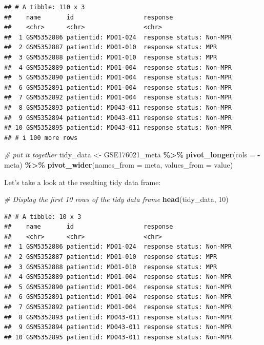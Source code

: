 \documentclass[
]{book}
\newenvironment{Shaded}{\begin{snugshade}}{\end{snugshade}}
\newcommand{\AttributeTok}[1]{\textcolor[rgb]{0.13,0.29,0.53}{#1}}
\newcommand{\CommentTok}[1]{\textcolor[rgb]{0.56,0.35,0.01}{\textit{#1}}}
\newcommand{\DecValTok}[1]{\textcolor[rgb]{0.00,0.00,0.81}{#1}}
\newcommand{\FunctionTok}[1]{\textcolor[rgb]{0.13,0.29,0.53}{\textbf{#1}}}
\newcommand{\NormalTok}[1]{#1}
\newcommand{\OtherTok}[1]{\textcolor[rgb]{0.56,0.35,0.01}{#1}}
\newcommand{\SpecialCharTok}[1]{\textcolor[rgb]{0.81,0.36,0.00}{\textbf{#1}}}
\begin{document}
\begin{verbatim}
## # A tibble: 110 x 3
##    name       id                   response                
##    <chr>      <chr>                <chr>                   
##  1 GSM5352886 patientid: MD01-024  response status: Non-MPR
##  2 GSM5352887 patientid: MD01-010  response status: MPR    
##  3 GSM5352888 patientid: MD01-010  response status: MPR    
##  4 GSM5352889 patientid: MD01-004  response status: Non-MPR
##  5 GSM5352890 patientid: MD01-004  response status: Non-MPR
##  6 GSM5352891 patientid: MD01-004  response status: Non-MPR
##  7 GSM5352892 patientid: MD01-004  response status: Non-MPR
##  8 GSM5352893 patientid: MD043-011 response status: Non-MPR
##  9 GSM5352894 patientid: MD043-011 response status: Non-MPR
## 10 GSM5352895 patientid: MD043-011 response status: Non-MPR
## # i 100 more rows
\end{verbatim}

\begin{Shaded}
\begin{Highlighting}[]
\CommentTok{\# put it together}
\NormalTok{tidy\_data }\OtherTok{\textless{}{-}}\NormalTok{ GSE176021\_meta }\SpecialCharTok{\%\textgreater{}\%}
  \FunctionTok{pivot\_longer}\NormalTok{(}\AttributeTok{cols =} \SpecialCharTok{{-}}\NormalTok{meta) }\SpecialCharTok{\%\textgreater{}\%}
  \FunctionTok{pivot\_wider}\NormalTok{(}\AttributeTok{names\_from =}\NormalTok{ meta, }\AttributeTok{values\_from =}\NormalTok{ value)}
\end{Highlighting}
\end{Shaded}

Let's take a look at the resulting tidy data frame:

\begin{Shaded}
\begin{Highlighting}[]
\CommentTok{\# Display the first 10 rows of the tidy data frame}
\FunctionTok{head}\NormalTok{(tidy\_data, }\DecValTok{10}\NormalTok{)}
\end{Highlighting}
\end{Shaded}

\begin{verbatim}
## # A tibble: 10 x 3
##    name       id                   response                
##    <chr>      <chr>                <chr>                   
##  1 GSM5352886 patientid: MD01-024  response status: Non-MPR
##  2 GSM5352887 patientid: MD01-010  response status: MPR    
##  3 GSM5352888 patientid: MD01-010  response status: MPR    
##  4 GSM5352889 patientid: MD01-004  response status: Non-MPR
##  5 GSM5352890 patientid: MD01-004  response status: Non-MPR
##  6 GSM5352891 patientid: MD01-004  response status: Non-MPR
##  7 GSM5352892 patientid: MD01-004  response status: Non-MPR
##  8 GSM5352893 patientid: MD043-011 response status: Non-MPR
##  9 GSM5352894 patientid: MD043-011 response status: Non-MPR
## 10 GSM5352895 patientid: MD043-011 response status: Non-MPR
\end{verbatim}
\end{document}
